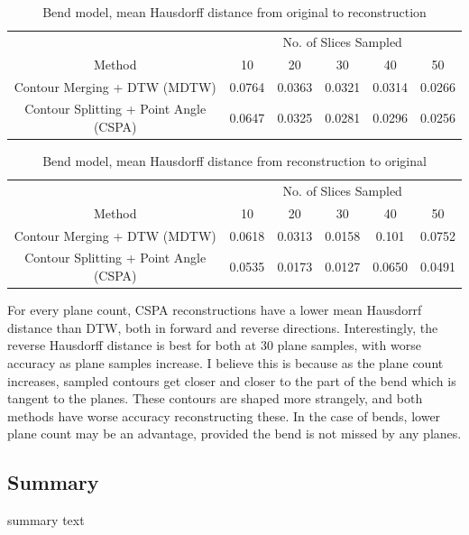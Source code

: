 \documentclass[11p, titlepage]{article}
\begin{document}
\begin{table}[h]
\begin{tabular}{ | c | c | c | c | c | c | }
\hline
& \multicolumn{5}{c|}{No. of Slices Sampled} \\
\cline{2-6}
Method & 10 & 20 & 30 & 40 & 50 \\
\hline
Contour Merging + DTW (MDTW) & 0.0764 & 0.0363 & 0.0321 & 0.0314 & 0.0266 \\
Contour Splitting + Point Angle (CSPA) & 0.0647 & 0.0325 & 0.0281 & 0.0296 & 0.0256 \\
\hline
\end{tabular}
\caption{Bend model, mean Hausdorff distance from original to reconstruction}
\label{table:bend_forward}
\end{table}

\begin{table}[h]
\begin{tabular}{ | c | c | c | c | c | c | }
\hline
& \multicolumn{5}{c|}{No. of Slices Sampled} \\
\cline{2-6}
Method & 10 & 20 & 30 & 40 & 50 \\
\hline
Contour Merging + DTW (MDTW) & 0.0618 & 0.0313 & 0.0158 & 0.101 & 0.0752 \\
Contour Splitting + Point Angle (CSPA) & 0.0535 & 0.0173 & 0.0127 & 0.0650 & 0.0491 \\
\hline
\end{tabular}
\caption{Bend model, mean Hausdorff distance from reconstruction to original}
\label{table:bend_reverse}
\end{table}

For every plane count, CSPA reconstructions have a lower mean Hausdorrf distance than DTW, both in forward and reverse directions. Interestingly, the reverse Hausdorff distance is best for both at 30 plane samples, with worse accuracy as plane samples increase. I believe this is because as the plane count increases, sampled contours get closer and closer to the part of the bend which is tangent to the planes. These contours are shaped more strangely, and both methods have worse accuracy reconstructing these. In the case of bends, lower plane count may be an advantage, provided the bend is not missed by any planes.

\subsection{Summary}

summary text
\end{document}
